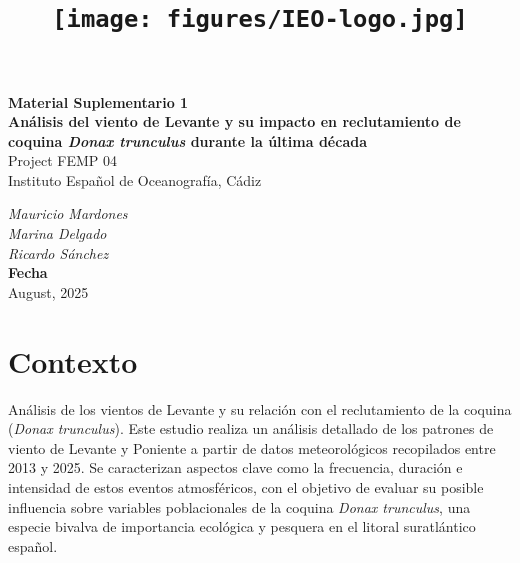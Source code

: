 \documentclass[
]{article}
\title{\texttt{[image: figures/IEO-logo.jpg]}}
\author{}
\date{\vspace{-2.5em}}
\begin{document}
\maketitle



\begin{flushleft}
\Large{\textbf{Material Suplementario 1}}\\
\vspace*{2\baselineskip}
\LARGE{\textbf{Análisis del viento de Levante y su impacto en reclutamiento de coquina \textit{Donax trunculus} durante la última década}}\\
\vspace*{5\baselineskip}
\Large{Project FEMP 04}\\
\vspace*{1\baselineskip}
\Large{Instituto Español de Oceanografía, Cádiz }\\
\vspace*{4\baselineskip}
\end{flushleft}
\begin{flushright}
\large{\textit{Mauricio Mardones}}\\
\large{\textit{Marina Delgado}}\\
\large{\textit{Ricardo Sánchez}}\\
\vspace*{1\baselineskip}
\normalsize{\textbf{Fecha}}\\
August, 2025
\end{flushright}



\hypersetup{linkcolor = black}
\newpage
{}

\newpage



\hypersetup{linkcolor = blue}

{
\hypersetup{linkcolor=}
\setcounter{tocdepth}{3}
\tableofcontents
}
\pagebreak

\section{Contexto}\label{contexto}

Análisis de los vientos de Levante y su relación con el reclutamiento de la coquina (\emph{Donax trunculus}). Este estudio realiza un análisis detallado de los patrones de viento de Levante y Poniente a partir de datos meteorológicos recopilados entre 2013 y 2025. Se caracterizan aspectos clave como la frecuencia, duración e intensidad de estos eventos atmosféricos, con el objetivo de evaluar su posible influencia sobre variables poblacionales de la coquina \emph{Donax trunculus}, una especie bivalva de importancia ecológica y pesquera en el litoral suratlántico español.
\end{document}

